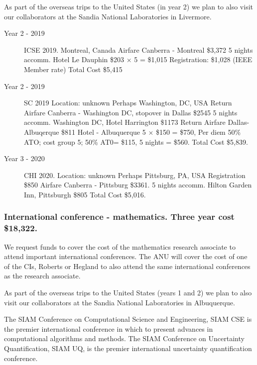 \documentclass[a4paper,fontsize=12pt]{scrartcl}
\begin{document}
As part of the overseas trips to the United States (in year 2) we plan to also visit our collaborators at the Sandia National Laboratories in Livermore. 




\begin{description}


\item[Year 2 - 2019] ICSE 2019.
Montreal, Canada
Airfare Canberra - Montreal \$3,372
5 nights accomm. Hotel Le Dauphin \$203 $\times$ 5 = \$1,015
Registration: \$1,028 (IEEE Member rate)
Total Cost \$5,415

\item[Year 2 - 2019] SC 2019
Location: unknown
Perhaps Washington, DC, USA
Return Airfare Canberra - Washington DC, stopover in Dallas  \$2545
5 nights accomm. Washington DC, Hotel Harrington \$1173
Return Airfare Dallas-Albuqerque \$811
Hotel - Albuquerque 5 $\times$  \$150 = \$750,
Per diem 50\% ATO; cost group 5; 50\% AT0= \$115, 5 nights = \$560. Total Cost \$5,839.

\item[Year 3 - 2020] CHI 2020.
Location: unknown 
Perhaps Pittsburg, PA, USA
Registration \$850 
Airfare Canberra - Pittsburg \$3361. 
5 nights accomm. Hilton Garden Inn, Pittsburgh \$805 
Total Cost \$5,016.



\end{description}


\subsubsection*{International conference - mathematics. Three year cost \$18,322.}


We request funds to cover the cost of the mathematics research associate to attend important international conferences.  The ANU will cover the cost of one of the CIs, Roberts or Hegland to also attend the same international conferences as the research associate. 

As part of the overseas trips to the United States (years 1 and 2) we plan to also visit our collaborators at the Sandia National Laboratories in Albuquerque. 

The SIAM Conference on Computational Science and Engineering, SIAM CSE is the premier international conference in which to present advances in computational algorithms and methods. The SIAM Conference on Uncertainty Quantification, SIAM UQ, is the premier international uncertainty quantification conference.
\end{document}
